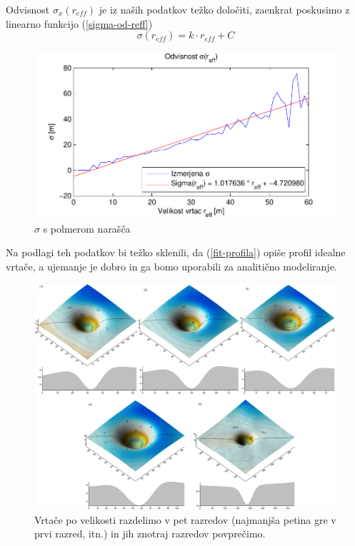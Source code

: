 \documentclass[a4paper, twoside, 12pt]{book}
\begin{document}
        Odvisnost $\sigma_x(r_{eff})$ je iz naših podatkov težko določiti, zaenkrat poskusimo z linearno funkcijo (\ref{sigma-od-reff})
        \begin{equation}
          \sigma (r_{eff}) = k \cdot r_{eff} + C
          \label{sigma-od-reff}
        \end{equation}
        \begin{figure}[h!]
          \begin{center}
            \includegraphics[width=12cm]{slike/menisija-sigme}
          \end{center}
          \caption{$\sigma$ s polmerom narašča}
          \label{fig:menisija-sigma}
        \end{figure}

        Na podlagi teh podatkov bi težko sklenili, da (\ref{fit-profila}) opiše profil idealne vrtače, a ujemanje je dobro in ga bomo uporabili za analitično modeliranje. 


        \begin{figure}[h]
          \begin{center}
            \includegraphics[width=19cm,angle=90]{slike/vrtace-po-razredih-menisija}
          \end{center}
          \caption{Vrtače po velikosti razdelimo v pet razredov (najmanjša petina gre v prvi razred, itn.) in jih znotraj razredov povprečimo.}
          \label{fig:menisija-vrtace-po-razredih}
        \end{figure}
\end{document}
